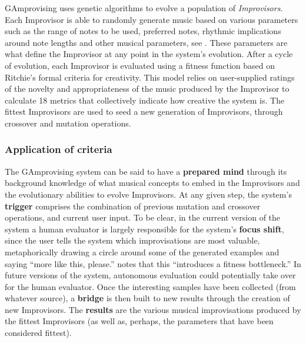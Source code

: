 {\sf GAmprovising} uses genetic algorithms to evolve a population of
\emph{Improvisors}. Each Improvisor is able to randomly generate music
based on various parameters such as the range of notes to be used,
preferred notes, rhythmic implications around note lengths and other
musical parameters, see \cite{jordanous10}. These parameters are what
define the Improvisor at any point in the system's evolution.  After a
cycle of evolution, each Improvisor is evaluated using a fitness
function based on Ritchie's \citeyear{ritchie07} formal criteria for
creativity.  This model relies on user-supplied ratings of the novelty
and appropriateness of the music produced by the Improvisor to
calculate 18 metrics that collectively indicate how creative the
system is.  The fittest Improvisors are used to seed a new generation
of Improvisors, through crossover and mutation operations.

\subsubsection{Application of criteria}

The {\sf GAmprovising} system can be said to have a \textbf{prepared
  mind} through its background knowledge of what musical concepts to
embed in the Improvisors and the evolutionary abilities to evolve
Improvisors.  At any given step, the system's \textbf{trigger}
comprises the combination of previous mutation and crossover
operations, and current user input.  To be clear, in the current
version of the system a human evaluator is largely responsible for the
system's \textbf{focus shift}, since the user tells the system which
improvisations are most valuable, metaphorically drawing a circle around some of the generated examples and saying ``more like this, please.''   notes that this
``introduces a fitness bottleneck.''  In future versions of the
system, autonomous evaluation could potentially take over for the
human evaluator.  Once the interesting samples have been collected
(from whatever source), a \textbf{bridge} is then built to new results
through the creation of new Improvisors.  The \textbf{results} are the
various musical improvisations produced by the fittest Improvisors (as
well as, perhaps, the parameters that have been considered fittest).

